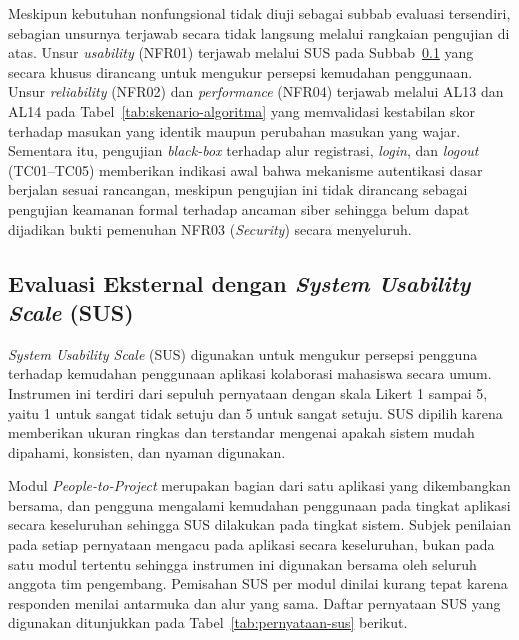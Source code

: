 Meskipun kebutuhan nonfungsional tidak diuji sebagai subbab evaluasi tersendiri, sebagian unsurnya terjawab secara tidak langsung melalui rangkaian pengujian di atas. Unsur \emph{usability} (NFR01) terjawab melalui SUS pada Subbab~\ref{subsec:sus} yang secara khusus dirancang untuk mengukur persepsi kemudahan penggunaan. Unsur \emph{reliability} (NFR02) dan \emph{performance} (NFR04) terjawab melalui AL13 dan AL14 pada Tabel~\ref{tab:skenario-algoritma} yang memvalidasi kestabilan skor terhadap masukan yang identik maupun perubahan masukan yang wajar. Sementara itu, pengujian \emph{black-box} terhadap alur registrasi, \emph{login}, dan \emph{logout} (TC01--TC05) memberikan indikasi awal bahwa mekanisme autentikasi dasar berjalan sesuai rancangan, meskipun pengujian ini tidak dirancang sebagai pengujian keamanan formal terhadap ancaman siber sehingga belum dapat dijadikan bukti pemenuhan NFR03 (\emph{Security}) secara menyeluruh.

\subsection{Evaluasi Eksternal dengan \emph{System Usability Scale} (SUS)}
\label{subsec:sus}

\emph{System Usability Scale} (SUS) digunakan untuk mengukur persepsi pengguna terhadap kemudahan penggunaan aplikasi kolaborasi mahasiswa secara umum. Instrumen ini terdiri dari sepuluh pernyataan dengan skala Likert 1 sampai 5, yaitu 1 untuk sangat tidak setuju dan 5 untuk sangat setuju. SUS dipilih karena memberikan ukuran ringkas dan terstandar mengenai apakah sistem mudah dipahami, konsisten, dan nyaman digunakan.

Modul \emph{People-to-Project} merupakan bagian dari satu aplikasi yang dikembangkan bersama, dan pengguna mengalami kemudahan penggunaan pada tingkat aplikasi secara keseluruhan sehingga SUS dilakukan pada tingkat sistem. Subjek penilaian pada setiap pernyataan mengacu pada aplikasi secara keseluruhan, bukan pada satu modul tertentu sehingga instrumen ini digunakan bersama oleh seluruh anggota tim pengembang. Pemisahan SUS per modul dinilai kurang tepat karena responden menilai antarmuka dan alur yang sama. Daftar pernyataan SUS yang digunakan ditunjukkan pada Tabel~\ref{tab:pernyataan-sus} berikut.

